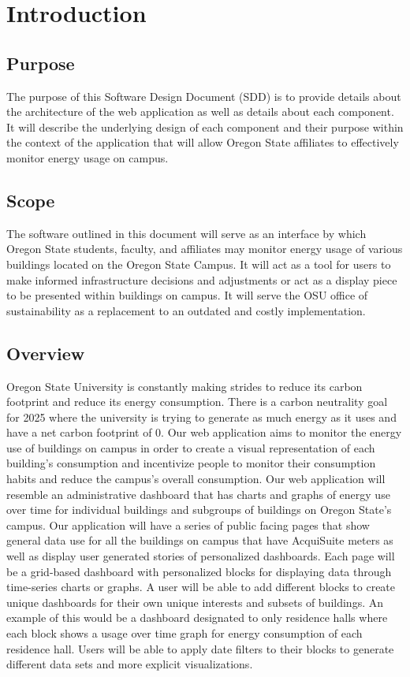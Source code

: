 \documentclass[journal,10pt,onecolumn,compsoc]{IEEEtran}
\begin{document}
    \section{Introduction}
    \subsection{Purpose}
	
    The purpose of this Software Design Document (SDD) is to provide details about the architecture of the web application as well
	as details about each component. It will describe the underlying design of each component and their purpose within the context
	of the application that will allow Oregon State affiliates to effectively monitor energy usage on campus.
	
    \subsection{Scope}
    
	The software outlined in this document will serve as an interface by which Oregon State students, faculty, and affiliates
	may monitor energy usage of various buildings located on the Oregon State Campus. It will act as a tool for users to 
	make informed infrastructure decisions and adjustments or act as a display piece to be presented within buildings on campus.
	It will serve the OSU office of sustainability as a replacement to an outdated and costly implementation. 
	
    \subsection{Overview}
    Oregon State University is constantly making strides to reduce its carbon footprint and reduce its energy consumption. There is a carbon neutrality goal for 2025 where the university is trying to generate as much energy as it uses and have a net carbon footprint of 0. Our web application aims to monitor the energy use of buildings on campus in order to create a visual representation of each building's consumption and incentivize people to monitor their consumption habits and reduce the campus's overall consumption.
    \noindent Our web application will resemble an administrative dashboard that has charts and graphs of energy use over time for individual buildings and subgroups of buildings on Oregon State's campus. 
    Our application will have a series of public facing pages that show general data use for all the buildings on campus that have AcquiSuite meters as well as display user generated stories of personalized dashboards. Each page will be a grid-based dashboard with personalized blocks for displaying data through time-series charts or graphs. A user will be able to add different blocks to create unique dashboards for their own unique interests and subsets of buildings. An example of this would be a dashboard designated to only residence halls where each block shows a usage over time graph for energy consumption of each residence hall. Users will be able to apply date filters to their blocks to generate different data sets and more explicit visualizations.
\end{document}

